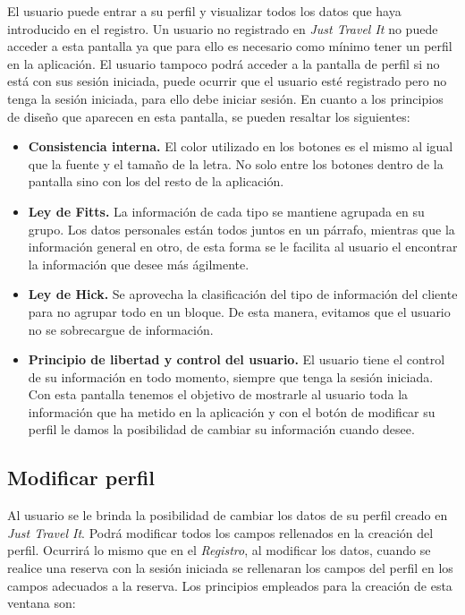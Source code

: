 El usuario puede entrar a su perfil y visualizar todos los datos que haya introducido en el
registro. Un usuario no registrado en \textit{Just Travel It} no puede acceder a esta pantalla ya que
para ello es necesario como mínimo tener un perfil en la aplicación. El usuario tampoco podrá
acceder a la pantalla de perfil si no está con sus sesión iniciada, puede ocurrir que el usuario
esté registrado pero no tenga la sesión iniciada, para ello debe iniciar sesión. En cuanto a los
principios de diseño que aparecen en esta pantalla, se pueden resaltar los siguientes:

\begin{itemize}
    \item \textbf{Consistencia interna.} El color utilizado en los botones es el mismo al igual
        que la fuente y el tamaño de la letra. No solo entre los botones dentro de la pantalla
        sino con los del resto de la aplicación.
    \item \textbf{Ley de Fitts.} La información de cada tipo se mantiene agrupada en su grupo. Los
        datos personales están todos juntos en un párrafo, mientras que la información general
        en otro, de esta forma se le facilita al usuario el encontrar la información que desee
        más ágilmente.
    \item \textbf{Ley de Hick.} Se aprovecha la clasificación del tipo de información del cliente para no
        agrupar todo en un bloque. De esta manera, evitamos que el usuario no se sobrecargue de
        información.
    \item \textbf{Principio de libertad y control del usuario.} El usuario tiene el control de su
        información en todo momento, siempre que tenga la sesión iniciada. Con esta pantalla
        tenemos el objetivo de mostrarle al usuario toda la información que ha metido en la
        aplicación y con el botón de modificar su perfil le damos la posibilidad de cambiar su
        información cuando desee.
\end{itemize}

\subsection*{Modificar perfil}

Al usuario se le brinda la posibilidad de cambiar los datos de su perfil creado en \textit{Just Travel It}. Podrá
modificar todos los campos rellenados en la creación del perfil. Ocurrirá lo mismo que en el \textit{Registro},
al modificar los datos, cuando se realice una reserva con la sesión iniciada se rellenaran los campos del perfil
en los campos adecuados a la reserva. Los principios empleados para la creación de esta ventana son:

